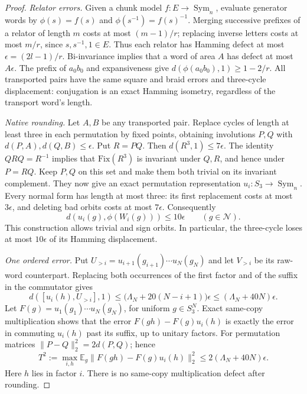 \documentclass[11pt,a4paper]{article}
\theoremstyle{plain}
\theoremstyle{definition}
\theoremstyle{remark}
\DeclareMathOperator{\Sym}{Sym}
\begin{document}
\begin{proof}
\emph{Relator errors.} Given a chunk model $f:E\to\Sym_n$, evaluate generator words by $\phi(s)=f(s)$ and
$\phi(s^{-1})=f(s)^{-1}$. Merging successive prefixes of a relator of length $m$ costs at most $(m-1)/r$;
replacing inverse letters costs at most $m/r$, since $s,s^{-1},1\in E$. Thus each relator has Hamming defect at most
$\epsilon=(2l-1)/r$. Bi-invariance implies that a word of area $A$ has defect at most $A\epsilon$.
The prefix of $a_0b_0$ and expansiveness give $d(\phi(a_0b_0),1)\ge1-2/r$. All transported pairs have the same square and braid
errors and three-cycle displacement: conjugation is an exact Hamming isometry, regardless of the transport word's length.

\emph{Native rounding.} Let $A,B$ be any transported pair. Replace cycles of length at least three in each permutation by fixed points,
obtaining involutions $P,Q$ with $d(P,A),d(Q,B)\le\epsilon$. Put $R=PQ$. Then
$d(R^3,1)\le7\epsilon$. The identity $QRQ=R^{-1}$ implies that $\mathrm{Fix}(R^3)$ is invariant under $Q,R$, and hence under $P=RQ$.
Keep $P,Q$ on this set and make them both trivial on its invariant complement. They now give an exact permutation representation
$u_i:S_3\to\Sym_n$. Every normal form has length at most three: its first replacement costs at most $3\epsilon$, and deleting bad
orbits costs at most $7\epsilon$. Consequently
\[
 d(u_i(g),\phi(W_i(g)))\le10\epsilon\qquad(g\in\mathcal N).
\]
This construction allows trivial and sign orbits. In particular, the three-cycle loses at most $10\epsilon$ of its Hamming displacement.

\emph{One ordered error.} Put $U_{>i}=u_{i+1}(g_{i+1})\cdots u_N(g_N)$ and let $V_{>i}$ be its raw-word counterpart.
Replacing both occurrences of the first factor and of the suffix in the commutator gives
\[
 d([u_i(h),U_{>i}],1)
 \le\bigl(\Lambda_N+20(N-i+1)\bigr)\epsilon
 \le(\Lambda_N+40N)\epsilon.
\]
Let $F(g)=u_1(g_1)\cdots u_N(g_N)$, for uniform $g\in S_3^N$. Exact same-copy multiplication shows that the error
$F(gh)-F(g)u_i(h)$ is exactly the error in commuting $u_i(h)$ past its suffix, up to unitary factors.
For permutation matrices $\|P-Q\|_2^2=2d(P,Q)$; hence
\[
 T^2:=\max_{i,h}\mathbb E_g\|F(gh)-F(g)u_i(h)\|_2^2
 \le2(\Lambda_N+40N)\epsilon.
\]
Here $h$ lies in factor $i$. There is no same-copy multiplication defect after rounding.


\end{proof}
\end{document}
